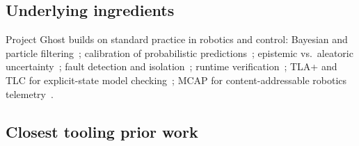 \documentclass[11pt,a4paper]{article}
\begin{document}
\subsection{Underlying ingredients}

Project Ghost builds on standard practice in robotics and control:
Bayesian and particle filtering~\cite{thrun2005probabilistic};
calibration of probabilistic
predictions~\cite{vovk2005algorithmic}; epistemic vs.\ aleatoric
uncertainty~\cite{kendall2017uncertainties}; fault detection and
isolation~\cite{isermann2006fdi}; runtime
verification~\cite{bartocci2018lectures}; TLA+ and TLC for
explicit-state model checking~\cite{lamport2002specifying}; MCAP for
content-addressable robotics telemetry~\cite{foxglove2022mcap}.

\subsection{Closest tooling prior work}
\end{document}

